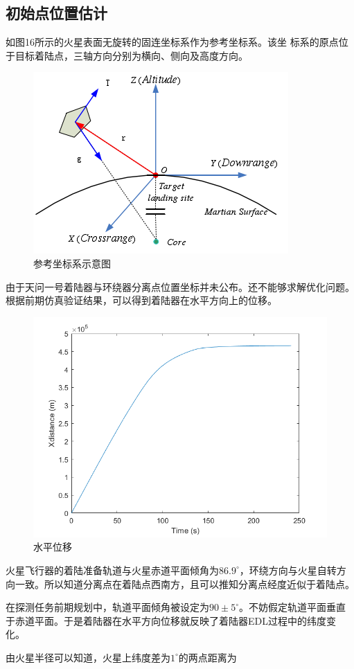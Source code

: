 \documentclass[UTF8,12pt]{ctexart}
\begin{document}
\subsection{初始点位置估计}
如图16所示的火星表面无旋转的固连坐标系作为参考坐标系。该坐
标系的原点位于目标着陆点，三轴方向分别为横向、侧向及高度方向。

\begin{figure}[htb]
	\centering
	\includegraphics[width=0.6\linewidth]{参考坐标系.png}
	\caption{参考坐标系示意图}
	\label{fig:pathdemo}	
\end{figure}

由于天问一号着陆器与环绕器分离点位置坐标并未公布。还不能够求解优化问题。根据前期仿真验证结果，可以得到着陆器在水平方向上的位移。

\begin{figure}[htb]
	\centering
	\includegraphics[width=0.6\linewidth]{水平位移.png}
	\caption{水平位移}
	\label{fig:pathdemo}	
\end{figure}

火星飞行器的着陆准备轨道与火星赤道平面倾角为$86.9^{\circ}$，环绕方向与火星自转方向一致。所以知道分离点在着陆点西南方，且可以推知分离点经度近似于着陆点。

在探测任务前期规划中，轨道平面倾角被设定为$90\pm5^\circ$。不妨假定轨道平面垂直于赤道平面。于是着陆器在水平方向位移就反映了着陆器EDL过程中的纬度变化。

由火星半径可以知道，火星上纬度差为$1^\circ$的两点距离为
\end{document}
